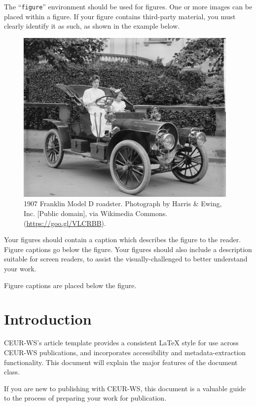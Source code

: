 \documentclass[
]{ceurart}
\begin{document}
The ``\verb|figure|'' environment should be used for figures. One or
more images can be placed within a figure. If your figure contains
third-party material, you must clearly identify it as such, as shown
in the example below.
\begin{figure}
  \centering
  \includegraphics[width=\linewidth]{sample-franklin}
  \caption{1907 Franklin Model D roadster. Photograph by Harris \&
    Ewing, Inc. [Public domain], via Wikimedia
    Commons. (\url{https://goo.gl/VLCRBB}).}
\end{figure}

Your figures should contain a caption which describes the figure to
the reader. Figure captions go below the figure. Your figures should
also include a description suitable for screen readers, to
assist the visually-challenged to better understand your work.

Figure captions are placed below the figure.


\section{Introduction}

CEUR-WS's article template provides a consistent \LaTeX{} style for
use across CEUR-WS publications, and incorporates accessibility and
metadata-extraction functionality. This document will explain the
major features of the document class.

If you are new to publishing with CEUR-WS, this document is a valuable
guide to the process of preparing your work for publication.
\end{document}
